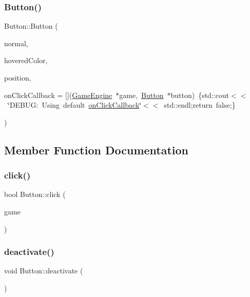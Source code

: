 \subsubsection{\texorpdfstring{Button()}{Button()}\hspace{0.1cm}{\footnotesize\ttfamily [2/2]}}
{\footnotesize\ttfamily Button\+::\+Button (\begin{DoxyParamCaption}\item[{sf\+::\+Texture $\ast$}]{normal,  }\item[{const sf\+::\+Color \&}]{hovered\+Color,  }\item[{const sf\+::\+Vector2f \&}]{position,  }\item[{bool($\ast$)(\mbox{\hyperlink{class_game_engine}{Game\+Engine}} $\ast$game, \mbox{\hyperlink{class_button}{Button}} $\ast$button)}]{on\+Click\+Callback = {\ttfamily \mbox{[}\mbox{]}(\mbox{\hyperlink{class_game_engine}{Game\+Engine}}~$\ast$game,~\mbox{\hyperlink{class_button}{Button}}~$\ast$button)~\{std\+:\+:cout$<$$<$~\char`\"{}DEBUG\+:~Using~default~\mbox{\hyperlink{class_button_a24293b3761997dd52758ee21c0058661}{on\+Click\+Callback}}\char`\"{}$<$$<$~std\+:\+:endl;return~false;\}} }\end{DoxyParamCaption})}



\subsection{Member Function Documentation}
\mbox{\label{class_button_ac5e8ae25dcb8a33c6e8711ddbaed71bf}} 
\subsubsection{\texorpdfstring{click()}{click()}}
{\footnotesize\ttfamily bool Button\+::click (\begin{DoxyParamCaption}\item[{\mbox{\hyperlink{class_game_engine}{Game\+Engine}} $\ast$}]{game }\end{DoxyParamCaption})}

\mbox{\label{class_button_a57efb09b51a4846a25e7f61abee78cd6}} 
\subsubsection{\texorpdfstring{deactivate()}{deactivate()}}
{\footnotesize\ttfamily void Button\+::deactivate (\begin{DoxyParamCaption}{ }\end{DoxyParamCaption})\hspace{0.3cm}{\ttfamily [inline]}}

